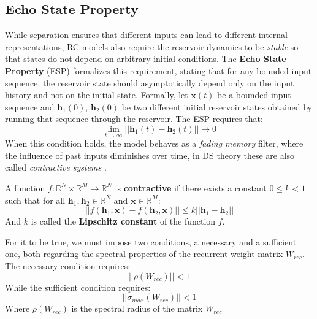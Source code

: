 \subsection{Echo State Property}
While separation ensures that different inputs can lead to different internal representations, RC models also require the reservoir dynamics to be \textit{stable} so that states do not depend on arbitrary initial conditions.
The \textbf{Echo State Property} (ESP) \cite{jaeger2001echo} formalizes this requirement, stating that for any bounded input sequence,
 the reservoir state should asymptotically depend only on the input history and not on the initial state.\newline
 Formally, let $\mathbf{x}(t)$ be a bounded input sequence and $\mathbf{h}_1(0)$, $\mathbf{h}_2(0)$ be two different initial reservoir states
 obtained by running that sequence through the reservoir. The ESP requires that:
 \begin{equation}
    \label{ESP}
    \lim_{t \to \infty} ||\mathbf{h}_1(t) - \mathbf{h}_2(t)|| \to 0 
 \end{equation}
When this condition holds, the model behaves as a \textit{fading memory} filter, where the influence of past inputs diminishes over time, in DS theory
these are also called \textit{contractive systems} \cite{strogatz:2000}. 
\begin{definition}
    A function $f: \mathbb{R}^N \times \mathbb{R}^M \to \mathbb{R}^N$ is \textbf{contractive} if there exists a constant $0 \leq k < 1$ such that for all $\mathbf{h}_1, \mathbf{h}_2 \in \mathbb{R}^N$ and $\mathbf{x} \in \mathbb{R}^M$:
    \begin{equation}
        ||f(\mathbf{h}_1, \mathbf{x}) - f(\mathbf{h}_2, \mathbf{x})|| \leq k ||\mathbf{h}_1 - \mathbf{h}_2||
    \end{equation}  
    And $k$ is called the \textbf{Lipschitz constant} of the function $f$.
\end{definition}
\newline
For it to be true, we must impose two conditions, a necessary and a sufficient one, both regarding the spectral properties of the recurrent weight matrix $W_{rec}$.
The necessary condition requires:
\begin{equation}
    ||\rho(W_{rec})|| < 1
\end{equation}
While the sufficient condition requires:
\begin{equation}
    ||\sigma_{max}(W_{rec})|| < 1
\end{equation}
Where $\rho(W_{rec})$ is the spectral radius of the matrix $W_{rec}$
